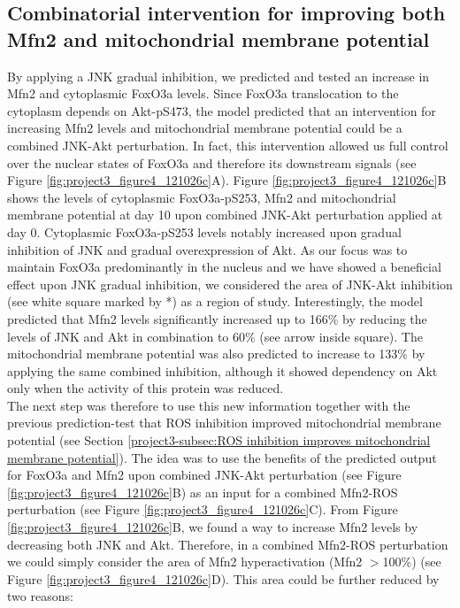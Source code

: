 \subsection{Combinatorial intervention for improving both Mfn2 and mitochondrial membrane potential}
\label{project3-subsec:Combinatorial intervention for improving both Mfn2 and mitochondrial membrane potential}
By applying a JNK gradual inhibition, we predicted and tested an increase in Mfn2 and cytoplasmic FoxO3a levels. Since FoxO3a translocation to the cytoplasm depends on Akt-pS473, the model predicted that an intervention for increasing Mfn2 levels and mitochondrial membrane potential could be a combined JNK-Akt perturbation. In fact, this intervention allowed us full control over the nuclear states of FoxO3a and therefore its downstream signals (see Figure \ref{fig:project3_figure4_121026c}A). Figure \ref{fig:project3_figure4_121026c}B shows the levels of cytoplasmic FoxO3a-pS253, Mfn2 and mitochondrial membrane potential at day 10 upon combined JNK-Akt perturbation applied at day 0. Cytoplasmic FoxO3a-pS253 levels notably increased upon gradual inhibition of JNK and gradual overexpression of Akt. As our focus was to maintain FoxO3a predominantly in the nucleus and we have showed a beneficial effect upon JNK gradual inhibition, we considered the area of JNK-Akt inhibition (see white 
square marked by *) as a region of study. Interestingly, the model predicted that Mfn2 levels significantly increased up to 166\% by reducing the levels of JNK and Akt in combination to 60\% (see arrow inside square). The mitochondrial membrane potential was also predicted to increase to 133\% by applying the same combined inhibition, although it showed dependency on Akt only when the activity of this protein was reduced.\\
The next step was therefore to use this new information together with the previous prediction-test that ROS inhibition improved mitochondrial membrane potential (see Section \ref{project3-subsec:ROS inhibition improves mitochondrial membrane potential}). The idea was to use the benefits of the predicted output for FoxO3a and Mfn2 upon combined JNK-Akt perturbation (see Figure \ref{fig:project3_figure4_121026c}B) as an input for a combined Mfn2-ROS perturbation (see Figure \ref{fig:project3_figure4_121026c}C). From Figure \ref{fig:project3_figure4_121026c}B, we found a way to increase Mfn2 levels by decreasing both JNK and Akt. Therefore, in a combined Mfn2-ROS perturbation we could simply consider the area of Mfn2 hyperactivation (Mfn2 $>$100\%) (see Figure \ref{fig:project3_figure4_121026c}D). This area could be further reduced by two reasons: 
